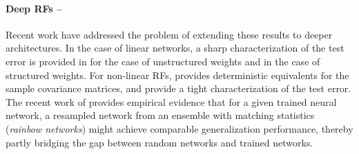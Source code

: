 \paragraph{Deep RFs -- } Recent work have addressed the problem of extending these results to deeper architectures. In the case of linear networks, a sharp characterization of the test error is provided in \cite{ZavatoneVeth2022ContrastingRA} for the case of unstructured weights and \cite{zavatone2023learning} in the case of structured weights. For non-linear RFs, \cite{schroder2023deterministic} provides deterministic equivalents for the sample covariance matrices, and \cite{schroder2023deterministic, bosch2023precise} provide a tight characterization of the test error. The recent work of \cite{guth2023rainbow} provides empirical evidence that for a given trained neural network, a resampled network from an ensemble with matching statistics (\emph{rainbow networks}) might achieve comparable generalization performance, thereby partly bridging the gap between random networks and trained networks.
